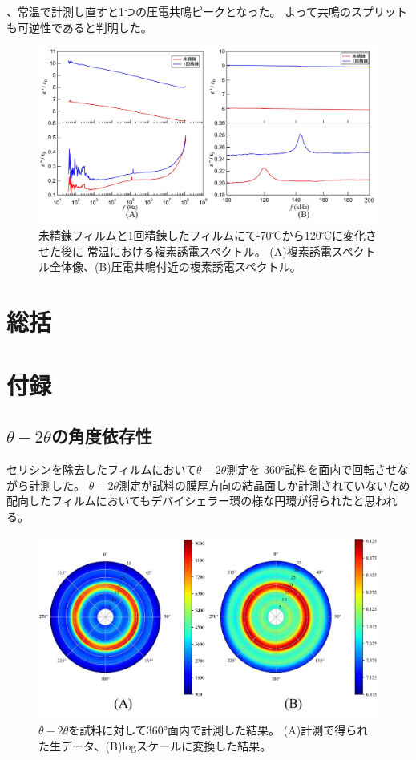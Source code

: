 \documentclass[dvipdfmx,12pt,a4paper]{jreport}
\begin{document}
			、常温で計測し直すと1つの圧電共鳴ピークとなった。
			よって共鳴のスプリットも可逆性であると判明した。
			\begin{figure}[h]
				\centering
				\includegraphics[width=\linewidth]{0_1_回_精錬_熱処理前後.jpg}
				\caption{未精錬フィルムと1回精錬したフィルムにて-70℃から120℃に変化させた後に
				常温における複素誘電スペクトル。
				(A)複素誘電スペクトル全体像、(B)圧電共鳴付近の複素誘電スペクトル。}
				\label{未精錬_1回精錬_熱処理後}
			\end{figure}
	\chapter{総括}
	\chapter{付録}
	\section{$\theta-2\theta$の角度依存性}
	セリシンを除去したフィルムにおいて$\theta-2\theta$測定を
	360°試料を面内で回転させながら計測した。
	$\theta-2\theta$測定が試料の膜厚方向の結晶面しか計測されていないため
	配向したフィルムにおいてもデバイシェラー環の様な円環が得られたと思われる。
	\begin{figure}[h]
		\centering
		\includegraphics{デバイ.jpg}
		\caption{$\theta-2\theta$を試料に対して360°面内で計測した結果。
		(A)計測で得られた生データ、(B)logスケールに変換した結果。}
	\end{figure}
	\newpage
\end{document}
